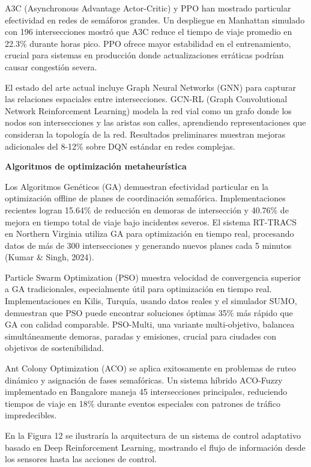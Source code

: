 \documentclass[12pt,a4paper,oneside]{report}
\begin{document}
A3C (Asynchronous Advantage Actor-Critic) y PPO han mostrado particular efectividad en redes de semáforos grandes. Un despliegue en Manhattan simulado con 196 intersecciones mostró que A3C reduce el tiempo de viaje promedio en 22.3\% durante horas pico. PPO ofrece mayor estabilidad en el entrenamiento, crucial para sistemas en producción donde actualizaciones erráticas podrían causar congestión severa.

El estado del arte actual incluye Graph Neural Networks (GNN) para capturar las relaciones espaciales entre intersecciones. GCN-RL (Graph Convolutional Network Reinforcement Learning) modela la red vial como un grafo donde los nodos son intersecciones y las aristas son calles, aprendiendo representaciones que consideran la topología de la red. Resultados preliminares muestran mejoras adicionales del 8-12\% sobre DQN estándar en redes complejas.

\textbf{Algoritmos de optimización metaheurística}

Los Algoritmos Genéticos (GA) demuestran efectividad particular en la optimización offline de planes de coordinación semafórica. Implementaciones recientes logran 15.64\% de reducción en demoras de intersección y 40.76\% de mejora en tiempo total de viaje bajo incidentes severos. El sistema RT-TRACS en Northern Virginia utiliza GA para optimización en tiempo real, procesando datos de más de 300 intersecciones y generando nuevos planes cada 5 minutos (Kumar \& Singh, 2024).

Particle Swarm Optimization (PSO) muestra velocidad de convergencia superior a GA tradicionales, especialmente útil para optimización en tiempo real. Implementaciones en Kilis, Turquía, usando datos reales y el simulador SUMO, demuestran que PSO puede encontrar soluciones óptimas 35\% más rápido que GA con calidad comparable. PSO-Multi, una variante multi-objetivo, balancea simultáneamente demoras, paradas y emisiones, crucial para ciudades con objetivos de sostenibilidad.

Ant Colony Optimization (ACO) se aplica exitosamente en problemas de ruteo dinámico y asignación de fases semafóricas. Un sistema híbrido ACO-Fuzzy implementado en Bangalore maneja 45 intersecciones principales, reduciendo tiempos de viaje en 18\% durante eventos especiales con patrones de tráfico impredecibles.

En la Figura 12 se ilustraría la arquitectura de un sistema de control adaptativo basado en Deep Reinforcement Learning, mostrando el flujo de información desde los sensores hasta las acciones de control.
\end{document}

